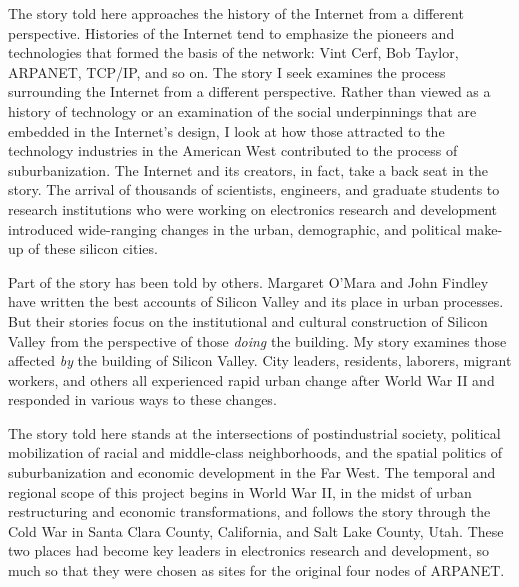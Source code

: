 \documentclass[11pt,article,oneside]{memoir}
\begin{document}
The story told here approaches the history of the Internet from a
different perspective. Histories of the Internet tend to emphasize the
pioneers and technologies that formed the basis of the network: Vint
Cerf, Bob Taylor, ARPANET, TCP/IP, and so on. The story I seek examines
the process surrounding the Internet from a different perspective.
Rather than viewed as a history of technology or an examination of the
social underpinnings that are embedded in the Internet's design, I look
at how those attracted to the technology industries in the American West
contributed to the process of suburbanization. The Internet and its
creators, in fact, take a back seat in the story. The arrival of
thousands of scientists, engineers, and graduate students to research
institutions who were working on electronics research and development
introduced wide-ranging changes in the urban, demographic, and political
make-up of these silicon cities.

Part of the story has been told by others. Margaret O'Mara and John
Findley have written the best accounts of Silicon Valley and its place
in urban processes. But their stories focus on the institutional and
cultural construction of Silicon Valley from the perspective of those
\emph{doing} the building. My story examines those affected \emph{by}
the building of Silicon Valley. City leaders, residents, laborers,
migrant workers, and others all experienced rapid urban change after
World War II and responded in various ways to these changes.

The story told here stands at the intersections of postindustrial
society, political mobilization of racial and middle-class
neighborhoods, and the spatial politics of suburbanization and economic
development in the Far West. The temporal and regional scope of this
project begins in World War II, in the midst of urban restructuring and
economic transformations, and follows the story through the Cold War in
Santa Clara County, California, and Salt Lake County, Utah. These two
places had become key leaders in electronics research and development,
so much so that they were chosen as sites for the original four nodes of
ARPANET.
\end{document}
